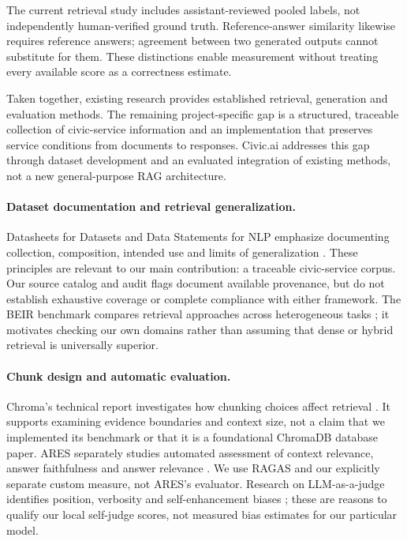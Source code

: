 The current retrieval study includes assistant-reviewed pooled labels, not independently human-verified ground truth. Reference-answer similarity likewise requires reference answers; agreement between two generated outputs cannot substitute for them. These distinctions enable measurement without treating every available score as a correctness estimate.

Taken together, existing research provides established retrieval, generation and evaluation methods. The remaining project-specific gap is a structured, traceable collection of civic-service information and an implementation that preserves service conditions from documents to responses. Civic.ai addresses this gap through dataset development and an evaluated integration of existing methods, not a new general-purpose RAG architecture.

\paragraph{Dataset documentation and retrieval generalization.}
Datasheets for Datasets and Data Statements for NLP emphasize documenting collection, composition, intended use and limits of generalization \cite{datasheets,datastatements}. These principles are relevant to our main contribution: a traceable civic-service corpus. Our source catalog and audit flags document available provenance, but do not establish exhaustive coverage or complete compliance with either framework. The BEIR benchmark compares retrieval approaches across heterogeneous tasks \cite{beir}; it motivates checking our own domains rather than assuming that dense or hybrid retrieval is universally superior.

\paragraph{Chunk design and automatic evaluation.}
Chroma's technical report investigates how chunking choices affect retrieval \cite{chroma_chunking}. It supports examining evidence boundaries and context size, not a claim that we implemented its benchmark or that it is a foundational ChromaDB database paper. ARES separately studies automated assessment of context relevance, answer faithfulness and answer relevance \cite{ares}. We use RAGAS and our explicitly separate custom measure, not ARES's evaluator. Research on LLM-as-a-judge identifies position, verbosity and self-enhancement biases \cite{llmjudge}; these are reasons to qualify our local self-judge scores, not measured bias estimates for our particular model.

